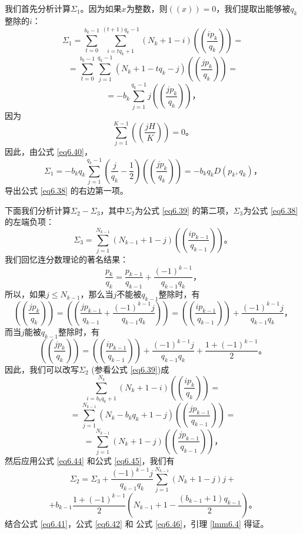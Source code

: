 \documentclass[11pt,a4paper]{article}
\theoremstyle{definition}
\newcommand{\refeq}[1]{公式 \ref{#1}}
\newcommand{\reflmm}[1]{引理 \ref{#1}}
\numberwithin{equation}{section}
\newcommand{\comma}{\text{，}}
\newcommand{\juhao}{\text{。}}
\newcommand{\myone}[1]{\left(-1\right)^{#1}}
\newcommand{\QEDopen}{{\setlength{\fboxsep}{0pt}\setlength{\fboxrule}{0.2pt}\fbox{\rule[0pt]{0pt}{1.3ex}\rule[0pt]{1.3ex}{0pt}}}}
\newcommand{\ddbrace}[1]{\left(\left(#1\right)\right)}
\begin{document}
我们首先分析计算$ \Sigma_{1} $。因为如果$ x $为整数，则$ \ddbrace{x}=0 $，我们提取出能够被$ q_{k} $整除的$ i $：
\[ \Sigma_{1}=\sum_{t=0}^{b_{k}-1}\sum_{i=tq_{k}+1}^{\left(t+1\right)q_{k}-1}\left(N_{k}+1-i\right)\ddbrace{\dfrac{ip_{k}}{q_{k}}}= \]
\[ =\sum_{t=0}^{b_{k}-1}\sum_{j=1}^{q_{k}-1}\left(N_{k}+1-tq_{k}-j\right)\ddbrace{\dfrac{jp_{k}}{q_{k}}}= \]
\begin{equation}\label{eq6.40}
=-b_{k}\sum_{j=1}^{q_{k}-1}j\ddbrace{\dfrac{jp_{k}}{q_{k}}}\comma
\end{equation}
因为
\[ \sum_{j=1}^{K-1}\ddbrace{\dfrac{jH}{K}}=0\juhao \]
因此，由\refeq{eq6.40}，
\begin{equation} \label{eq6.41}
	\Sigma_{1}=-b_{k}q_{k}\sum_{j=1}^{q_{k}-1}\left(\dfrac{j}{q_{k}}-\dfrac{1}{2}\right)\ddbrace{\dfrac{jp_{k}}{q_{k}}}=-b_{k}q_{k}D\left(p_{k},q_{k}\right)\comma
\end{equation}
导出\refeq{eq6.38} 的右边第一项。

下面我们分析计算$ \Sigma_{2}-\Sigma_{3} $，其中$ \Sigma_{2} $为\refeq{eq6.39} 的第二项，$ \Sigma_{3} $为\refeq{eq6.38} 的左端负项：
\begin{equation}\label{eq6.42}
	\Sigma_{3}=\sum_{j=1}^{N_{k-1}}\left(N_{k-1}+1-j\right)\ddbrace{\dfrac{ip_{k-1}}{q_{k-1}}}\juhao
\end{equation}
我们回忆连分数理论的著名结果：
\begin{equation}\label{eq6.43}
	\dfrac{p_{k}}{q_{k}}=\dfrac{p_{k-1}}{q_{k-1}}+\dfrac{\myone{k-1}}{q_{k-1}q_{k}}\comma
\end{equation}
所以，如果$ j\leq N_{k-1} $，那么当$ j $不能被$ q_{k-1} $整除时，有
\begin{equation}\label{eq6.44}
	\ddbrace{\dfrac{jp_{k}}{q_{k}}}=\ddbrace{\dfrac{jp_{k-1}}{q_{k-1}}+\dfrac{\myone{k-1}j}{q_{k-1}q_{k}}}=\ddbrace{\dfrac{ip_{k-1}}{q_{k-1}}}+\dfrac{\myone{k-1}j}{q_{k-1}q_{k}}\comma
\end{equation}
而当$ j $能被$ q_{k-1} $整除时，有
\begin{equation}\label{eq6.45}
\ddbrace{\dfrac{jp_{k}}{q_{k}}}=\ddbrace{\dfrac{ip_{k-1}}{q_{k-1}}}+\dfrac{\myone{k-1}j}{q_{k-1}q_{k}}+\dfrac{1+\myone{k-1}}{2}\juhao
\end{equation}
因此，我们可以改写$ \Sigma_{2} $ (参看\refeq{eq6.39})成
\[ \sum_{i=b_{k}q_{k}+1}^{N_{k}}\left(N_{k}+1-i\right)\ddbrace{\dfrac{ip_{k}}{q_{k}}}= \]
\[ =\sum_{j=1}^{N_{k-1}}\left(N_{k}-b_{k}q_{k}+1-j\right)\ddbrace{\dfrac{jp_{k-1}}{q_{k-1}}}= \]
\[ =\sum_{j=1}^{N_{k-1}}\left(N_{k}+1-j\right)\ddbrace{\dfrac{jp_{k-1}}{q_{k-1}}}\comma \]
然后应用\refeq{eq6.44} 和\refeq{eq6.45}，我们有
\[ \Sigma_{2}=\Sigma_{3}+\dfrac{\myone{k-1}j}{q_{k-1}q_{k}}\sum_{j=1}^{N_{k-1}}\left(N_{k}+1-j\right)j+ \]
\begin{equation}\label{eq6.46}
+b_{k-1}\dfrac{1+\myone{k-1}}{2}\left(N_{k-1}+1-\dfrac{\left(b_{k-1}+1\right)q_{k-1}}{2}\right)\juhao
\end{equation}
结合\refeq{eq6.41}，\refeq{eq6.42} 和 \refeq{eq6.46}，\reflmm{lmm6.4} 得证。\hfill\QEDopen
\end{document}
